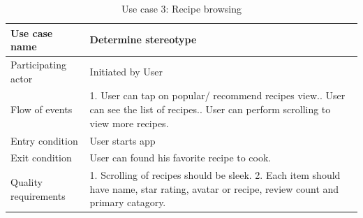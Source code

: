    \begin{table}[ht]
   	\centering %
   	\begin{tabular}{p{4cm} p{10cm}}  %
   		\hline\hline %
   		Use case name & Determine stereotype \\ %
   		\hline %
   		
   		Participating actor & Initiated by User \\ %
   		Flow of events & 1. User can tap on popular/ recommend recipes view.\newline 
   		2. User can see the list of recipes.\newline
   		3. User can perform scrolling to view more recipes.\\
   		Entry condition & User starts app\\
   		Exit condition & User can found his favorite recipe to cook.\\
   		Quality requirements & 1. Scrolling of recipes should be sleek.
   		2. Each item should have name, star rating, avatar or recipe, review count and primary catagory.\\ [1ex] %
   		\hline %
   	\end{tabular}
   	\caption{Use case 3: Recipe browsing}
   	\label{table:recipe_browsing}
   \end{table}
   
